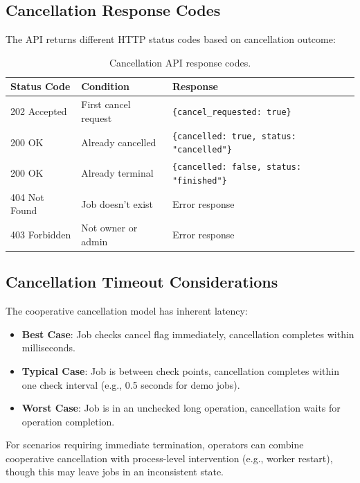 \subsection{Cancellation Response Codes}

The API returns different HTTP status codes based on cancellation outcome:

\begin{table}[ht]
\centering
\caption{Cancellation API response codes.}
\label{tab:cancel-responses}
\small
\begin{tabular}{lll}
\hline
\textbf{Status Code} & \textbf{Condition} & \textbf{Response} \\
\hline
202 Accepted & First cancel request & \texttt{\{cancel\_requested: true\}} \\
200 OK & Already cancelled & \texttt{\{cancelled: true, status: "cancelled"\}} \\
200 OK & Already terminal & \texttt{\{cancelled: false, status: "finished"\}} \\
404 Not Found & Job doesn't exist & Error response \\
403 Forbidden & Not owner or admin & Error response \\
\hline
\end{tabular}
\end{table}

\subsection{Cancellation Timeout Considerations}

The cooperative cancellation model has inherent latency:

\begin{itemize}
    \item \textbf{Best Case}: Job checks cancel flag immediately, cancellation completes within milliseconds.
    
    \item \textbf{Typical Case}: Job is between check points, cancellation completes within one check interval (e.g., 0.5 seconds for demo jobs).
    
    \item \textbf{Worst Case}: Job is in an unchecked long operation, cancellation waits for operation completion.
\end{itemize}

For scenarios requiring immediate termination, operators can combine cooperative cancellation with process-level intervention (e.g., worker restart), though this may leave jobs in an inconsistent state.

